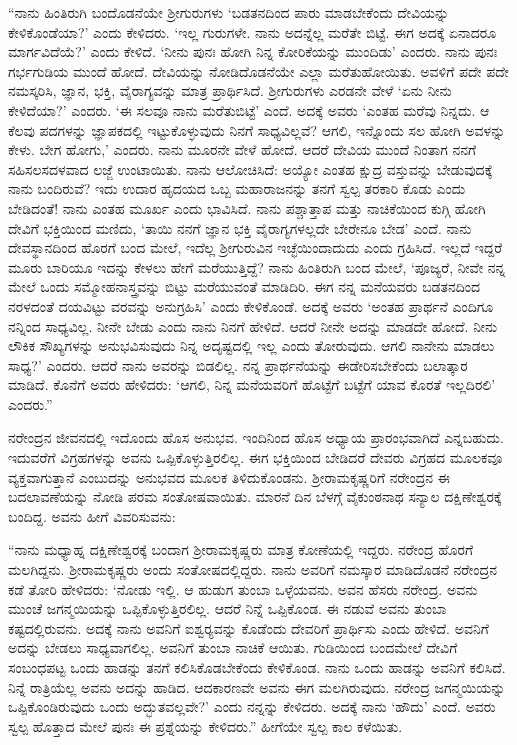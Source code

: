 “ನಾನು ಹಿಂತಿರುಗಿ ಬಂದೊಡನೆಯೇ ಶ‍್ರೀಗುರುಗಳು ‘ಬಡತನದಿಂದ ಪಾರು ಮಾಡಬೇಕೆಂದು ದೇವಿಯನ್ನು ಕೇಳಿಕೊಂಡೆಯಾ?’ ಎಂದು ಕೇಳಿದರು. ‘ಇಲ್ಲ ಗುರುಗಳೇ. ನಾನು ಅದನ್ನೆಲ್ಲ ಮರೆತೇ ಬಿಟ್ಟೆ. ಈಗ ಅದಕ್ಕೆ ಏನಾದರೂ ಮಾರ್ಗವಿದೆಯೆ?’ ಎಂದು ಕೇಳಿದೆ. ‘ನೀನು ಪುನಃ ಹೋಗಿ ನಿನ್ನ ಕೋರಿಕೆಯನ್ನು ಮುಂದಿಡು’ ಎಂದರು. ನಾನು ಪುನಃ ಗರ್ಭಗುಡಿಯ ಮುಂದೆ ಹೋದೆ. ದೇವಿಯನ್ನು ನೋಡಿದೊಡನೆಯೇ ಎಲ್ಲಾ ಮರೆತುಹೋಯಿತು. ಅವಳಿಗೆ ಪದೇ ಪದೇ ನಮಸ್ಕರಿಸಿ, ಜ್ಞಾನ, ಭಕ್ತಿ, ವೈರಾಗ್ಯವನ್ನು ಮಾತ್ರ ಪ್ರಾರ್ಥಿಸಿದೆ. ಶ‍್ರೀಗುರುಗಳು ಎರಡನೇ ವೇಳೆ ‘ಏನು ನೀನು ಕೇಳಿದೆಯಾ?’ ಎಂದರು. ‘ಈ ಸಲವೂ ನಾನು ಮರೆತುಬಿಟ್ಟೆ’ ಎಂದೆ. ಅದಕ್ಕೆ ಅವರು ‘ಎಂತಹ ಮರೆವು ನಿನ್ನದು. ಆ ಕೆಲವು ಪದಗಳನ್ನು ಜ್ಞಾಪಕದಲ್ಲಿ ಇಟ್ಟುಕೊಳ್ಳುವುದು ನಿನಗೆ ಸಾಧ್ಯವಿಲ್ಲವೆ? ಆಗಲಿ, ಇನ್ನೊಂದು ಸಲ ಹೋಗಿ ಅವಳನ್ನು ಕೇಳು. ಬೇಗ ಹೋಗು,’ ಎಂದರು. ನಾನು ಮೂರನೇ ವೇಳೆ ಹೋದೆ. ಆದರೆ ದೇವಿಯ ಮುಂದೆ ನಿಂತಾಗ ನನಗೆ ಸಹಿಸಲಸದಳವಾದ ಲಜ್ಜೆ ಉಂಟಾಯಿತು. ನಾನು ಆಲೋಚಿಸಿದೆ: ಅಯ್ಯೋ ಎಂತಹ ಕ್ಷುದ್ರ ವಸ್ತುವನ್ನು ಬೇಡುವುದಕ್ಕೆ ನಾನು ಬಂದಿರುವೆ? ಇದು ಉದಾರ ಹೃದಯದ ಒಬ್ಬ ಮಹಾರಾಜನನ್ನು ತನಗೆ ಸ್ವಲ್ಪ ತರಕಾರಿ ಕೊಡು ಎಂದು ಬೇಡಿದಂತೆ! ನಾನು ಎಂತಹ ಮೂರ್ಖ ಎಂದು ಭಾವಿಸಿದೆ. ನಾನು ಪಶ್ಚಾತ್ತಾಪ ಮತ್ತು ನಾಚಿಕೆಯಿಂದ ಕುಗ್ಗಿ ಹೋಗಿ ದೇವಿಗೆ ಭಕ್ತಿಯಿಂದ ಮಣಿದು, ‘ತಾಯಿ ನನಗೆ ಜ್ಞಾನ ಭಕ್ತಿ ವೈರಾಗ್ಯಗಳಲ್ಲದೇ ಬೇರೇನೂ ಬೇಡ’ ಎಂದೆ. ನಾನು ದೇವಸ್ಥಾನದಿಂದ ಹೊರಗೆ ಬಂದ ಮೇಲೆ, ಇದೆಲ್ಲ ಶ‍್ರೀಗುರುವಿನ ಇಚ್ಛೆಯಿಂದಾದುದು ಎಂದು ಗ್ರಹಿಸಿದೆ. ಇಲ್ಲದೆ ಇದ್ದರೆ ಮೂರು ಬಾರಿಯೂ ಇದನ್ನು ಕೇಳಲು ಹೇಗೆ ಮರೆಯುತ್ತಿದ್ದೆ? ನಾನು ಹಿಂತಿರುಗಿ ಬಂದ ಮೇಲೆ, ‘ಪೂಜ್ಯರೆ, ನೀವೇ ನನ್ನ ಮೇಲೆ ಒಂದು ಸಮ್ಮೋಹನಾಸ್ತ್ರವನ್ನು ಬಿಟ್ಟು ಮರೆಯುವಂತೆ ಮಾಡಿದಿರಿ. ಈಗ ನನ್ನ ಮನೆಯವರು ಬಡತನದಿಂದ ನರಳದಂತೆ ದಯವಿಟ್ಟು ವರವನ್ನು ಅನುಗ್ರಹಿಸಿ’ ಎಂದು ಕೇಳಿಕೊಂಡೆ. ಅದಕ್ಕೆ ಅವರು ‘ಅಂತಹ ಪ್ರಾರ್ಥನೆ ಎಂದಿಗೂ ನನ್ನಿಂದ ಸಾಧ್ಯವಿಲ್ಲ. ನೀನೇ ಬೇಡು ಎಂದು ನಾನು ನಿನಗೆ ಹೇಳಿದೆ. ಆದರೆ ನೀನೇ ಅದನ್ನು ಮಾಡದೇ ಹೋದೆ. ನೀನು ಲೌಕಿಕ ಸೌಖ್ಯಗಳನ್ನು ಅನುಭವಿಸುವುದು ನಿನ್ನ ಅದೃಷ್ಟದಲ್ಲಿ ಇಲ್ಲ ಎಂದು ತೋರುವುದು. ಆಗಲಿ ನಾನೇನು ಮಾಡಲು ಸಾಧ್ಯ?’ ಎಂದರು. ಆದರೆ ನಾನು ಅವರನ್ನು ಬಿಡಲಿಲ್ಲ. ನನ್ನ ಪ್ರಾರ್ಥನೆಯನ್ನು ಈಡೇರಿಸಬೇಕೆಂದು ಬಲಾತ್ಕಾರ ಮಾಡಿದೆ. ಕೊನೆಗೆ ಅವರು ಹೇಳಿದರು: ‘ಆಗಲಿ, ನಿನ್ನ ಮನೆಯವರಿಗೆ ಹೊಟ್ಟೆಗೆ ಬಟ್ಟೆಗೆ ಯಾವ ಕೊರತೆ ಇಲ್ಲದಿರಲಿ’ ಎಂದರು.”

ನರೇಂದ್ರನ ಜೀವನದಲ್ಲಿ ಇದೊಂದು ಹೊಸ ಅನುಭವ. ಇಂದಿನಿಂದ ಹೊಸ ಅಧ್ಯಾಯ ಪ್ರಾರಂಭವಾಗಿದೆ ಎನ್ನಬಹುದು. ಇದುವರೆಗೆ ವಿಗ್ರಹಗಳನ್ನು ಅವನು ಒಪ್ಪಿಕೊಳ್ಳುತ್ತಿರಲಿಲ್ಲ. ಈಗ ಭಕ್ತಿಯಿಂದ ಬೇಡಿದರೆ ದೇವರು ವಿಗ್ರಹದ ಮೂಲಕವೂ ವ್ಯಕ್ತವಾಗುತ್ತಾನೆ ಎಂಬುದನ್ನು ಅನುಭವದ ಮೂಲಕ ತಿಳಿದುಕೊಂಡನು. ಶ‍್ರೀರಾಮಕೃಷ್ಣರಿಗೆ ನರೇಂದ್ರನ ಈ ಬದಲಾವಣೆಯನ್ನು ನೋಡಿ ಪರಮ ಸಂತೋಷವಾಯಿತು. ಮಾರನೆ ದಿನ ಬೆಳಗ್ಗೆ ವೈಕುಂಠನಾಥ ಸನ್ಯಾಲ ದಕ್ಷಿಣೇಶ್ವರಕ್ಕೆ ಬಂದಿದ್ದ. ಅವನು ಹೀಗೆ ವಿವರಿಸುವನು:

“ನಾನು ಮಧ್ಯಾಹ್ನ ದಕ್ಷಿಣೇಶ್ವರಕ್ಕೆ ಬಂದಾಗ ಶ‍್ರೀರಾಮಕೃಷ್ಣರು ಮಾತ್ರ ಕೋಣೆಯಲ್ಲಿ ಇದ್ದರು. ನರೇಂದ್ರ ಹೊರಗೆ ಮಲಗಿದ್ದನು. ಶ‍್ರೀರಾಮಕೃಷ್ಣರು ಅಂದು ಸಂತೋಷದಲ್ಲಿದ್ದರು. ನಾನು ಅವರಿಗೆ ನಮಸ್ಕಾರ ಮಾಡಿದೊಡನೆ ನರೇಂದ್ರನ ಕಡೆ ತೋರಿ ಹೇಳಿದರು: ‘ನೋಡು ಇಲ್ಲಿ. ಆ ಹುಡುಗ ತುಂಬಾ ಒಳ್ಳೆಯವನು. ಅವನ ಹೆಸರು ನರೇಂದ್ರ. ಅವನು ಮುಂಚೆ ಜಗನ್ಮಯಿಯನ್ನು ಒಪ್ಪಿಕೊಳ್ಳುತ್ತಿರಲಿಲ್ಲ. ಆದರೆ ನಿನ್ನೆ ಒಪ್ಪಿಕೊಂಡ. ಈ ನಡುವೆ ಅವನು ತುಂಬಾ ಕಷ್ಟದಲ್ಲಿರುವನು. ಅದಕ್ಕೆ ನಾನು ಅವನಿಗೆ ಐಶ್ವರ‍್ಯವನ್ನು ಕೊಡೆಂದು ದೇವರಿಗೆ ಪ್ರಾರ್ಥಿಸು ಎಂದು ಹೇಳಿದೆ. ಅವನಿಗೆ ಅದನ್ನು ಬೇಡಲು ಸಾಧ್ಯವಾಗಲಿಲ್ಲ. ಅವನಿಗೆ ತುಂಬಾ ನಾಚಿಕೆ ಆಯಿತು. ಗುಡಿಯಿಂದ ಬಂದಮೇಲೆ ದೇವಿಗೆ ಸಂಬಂಧಪಟ್ಟ ಒಂದು ಹಾಡನ್ನು ತನಗೆ ಕಲಿಸಿಕೊಡಬೇಕೆಂದು ಕೇಳಿಕೊಂಡ. ನಾನು ಒಂದು ಹಾಡನ್ನು ಅವನಿಗೆ ಕಲಿಸಿದೆ. ನಿನ್ನೆ ರಾತ್ರಿಯೆಲ್ಲ ಅವನು ಅದನ್ನು ಹಾಡಿದ. ಆದಕಾರಣವೇ ಅವನು ಈಗ ಮಲಗಿರುವುದು. ನರೇಂದ್ರ ಜಗನ್ಮಯಿಯನ್ನು ಒಪ್ಪಿಕೊಂಡಿರುವುದು ಒಂದು ಅದ್ಭುತವಲ್ಲವೇ?’ ಎಂದು ನನ್ನನ್ನು ಕೇಳಿದರು. ಅದಕ್ಕೆ ನಾನು ‘ಹೌದು’ ಎಂದೆ. ಅವರು ಸ್ವಲ್ಪ ಹೊತ್ತಾದ ಮೇಲೆ ಪುನಃ ಈ ಪ್ರಶ್ನೆಯನ್ನು ಕೇಳಿದರು.” ಹೀಗೆಯೇ ಸ್ವಲ್ಪ ಕಾಲ ಕಳೆಯಿತು.


